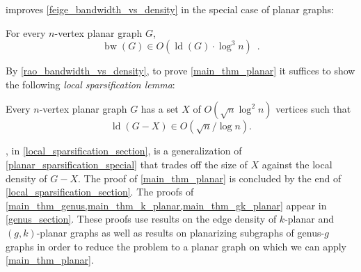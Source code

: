 \documentclass{patmorin}
\newcommand{\defin}[1]{\emph{\textcolor{brightmaroon}{#1}}}
\DeclareMathOperator{\bw}{bw}
\DeclareMathOperator{\ld}{ld}
\begin{document}
\citet{rao:small} improves \cref{feige_bandwidth_vs_density} in the special case of planar graphs:%

\begin{thm}
\label{rao_bandwidth_vs_density}
  For every $n$-vertex planar graph $G$,
  \[
    \bw(G)\in O\left(\ld(G)\cdot \log^3 n\right) \enspace .
  \]
\end{thm}

By \cref{rao_bandwidth_vs_density}, to prove \cref{main_thm_planar} it suffices to show the following \defin{local sparsification lemma}:

\begin{lem}\label{planar_sparsification_special}
  Every $n$-vertex planar graph $G$ has a set $X$ of $O(\sqrt{n}\log^2 n)$ vertices such that
  $$\ld(G-X)\in O(\sqrt{n}/\log n).$$
\end{lem}


, in \cref{local_sparsification_section}, is a generalization of \cref{planar_sparsification_special} that trades off the size of $X$ against the local density of $G-X$.  The proof of \cref{main_thm_planar} is concluded by the end of \cref{local_sparsification_section}.  The proofs of \cref{main_thm_genus,main_thm_k_planar,main_thm_gk_planar} appear in \cref{genus_section}.  These proofs use results on the edge density of $k$-planar and $(g,k)$-planar graphs as well as results on planarizing subgraphs of genus-$g$ graphs in order to reduce the problem to a planar graph on which we can apply \cref{main_thm_planar}.

%


\end{document}
